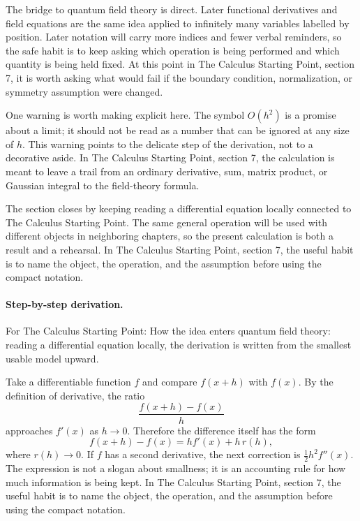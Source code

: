 The bridge to quantum field theory is direct.  Later functional derivatives and field equations are the same idea applied to infinitely many variables labelled by position.  Later notation will carry more indices and fewer verbal reminders, so the safe habit is to keep asking which operation is being performed and which quantity is being held fixed.  At this point in The Calculus Starting Point, section 7, it is worth asking what would fail if the boundary condition, normalization, or symmetry assumption were changed.

One warning is worth making explicit here.  The symbol \(O(h^2)\) is a promise about a limit; it should not be read as a number that can be ignored at any size of \(h\).  This warning points to the delicate step of the derivation, not to a decorative aside.  In The Calculus Starting Point, section 7, the calculation is meant to leave a trail from an ordinary derivative, sum, matrix product, or Gaussian integral to the field-theory formula.

The section closes by keeping reading a differential equation locally connected to The Calculus Starting Point.  The same general operation will be used with different objects in neighboring chapters, so the present calculation is both a result and a rehearsal.  In The Calculus Starting Point, section 7, the useful habit is to name the object, the operation, and the assumption before using the compact notation.



\paragraph{Step-by-step derivation.}

For The Calculus Starting Point: How the idea enters quantum field theory: reading a differential equation locally, the derivation is written from the smallest usable model upward.

Take a differentiable function \(f\) and compare \(f(x+h)\) with \(f(x)\).  By the definition of derivative, the ratio
\[
  \frac{f(x+h)-f(x)}{h}
\]
approaches \(f'(x)\) as \(h\to0\).  Therefore the difference itself has the form
\[
  f(x+h)-f(x)=hf'(x)+h\,r(h),
\]
where \(r(h)\to0\).  If \(f\) has a second derivative, the next correction is \(\frac12h^2f''(x)\).  The expression is not a slogan about smallness; it is an accounting rule for how much information is being kept.  In The Calculus Starting Point, section 7, the useful habit is to name the object, the operation, and the assumption before using the compact notation.

